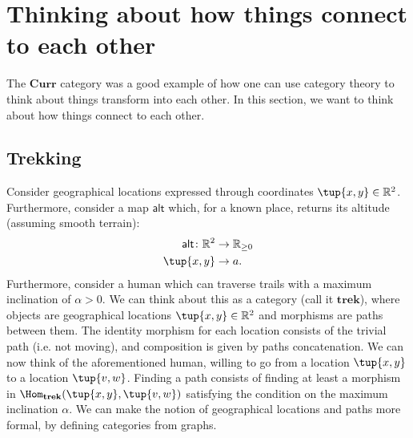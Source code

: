\section{Thinking about how things connect to each other}
The $\mathbf{Curr}$ category was a good example of how one can use category theory to think about things transform into each other. In this section, we want to think about how things connect to each other.
\subsection{Trekking}
\label{sec:trekking}
Consider geographical locations expressed through coordinates $\tup{x,y}\in \mathbb{R}^2$. Furthermore, consider a map $\mathsf{alt}$ which, for a known place, returns its altitude (assuming smooth terrain):
\begin{equation}
    \begin{aligned}
    \mathsf{alt}\colon \mathbb{R}^2&\to \mathbb{R}_{\geq 0}\\
    \tup{x,y}&\to a.
    \end{aligned}
\end{equation}
Furthermore, consider a human which can traverse trails with a maximum inclination of $\alpha>0$. We can think about this as a category (call it $\mathbf{trek}$), where objects are geographical locations $\tup{x,y}\in \mathbb{R}^2$ and morphisms are paths between them. The identity morphism for each location consists of the trivial path (i.e. not moving), and composition is given by paths concatenation. We can now think of the aforementioned human, willing to go from a location $\tup{x,y}$ to a location $\tup{v,w}$. Finding a path consists of finding at least a morphism in $\Hom_\mathbf{trek}(\tup{x,y},\tup{v,w})$ satisfying the condition on the maximum inclination $\alpha$. We can make the notion of geographical locations and paths more formal, by defining categories from graphs.




